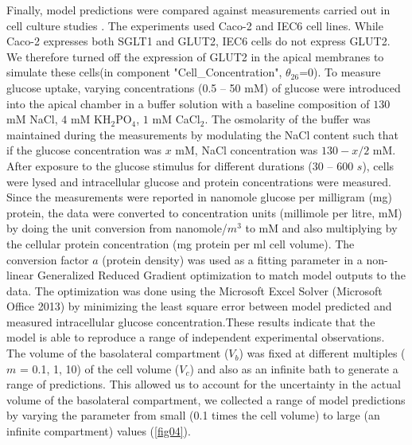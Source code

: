 \documentclass[fleqn,10pt]{physiome}
\begin{document}
Finally, model predictions were compared against measurements carried out in
cell culture studies \citep{zheng2012mechanisms}. The experiments used Caco-2 and
IEC6 cell lines. While Caco-2 expresses both SGLT1 and GLUT2, IEC6 cells
do not express GLUT2. We therefore turned off the expression of GLUT2 in
the apical membranes to simulate these cells(in component "Cell\_Concentration", {$\theta_{26}$}=0). To measure glucose uptake, varying concentrations (0.5 -- 50 mM) of glucose were introduced into the apical chamber in a buffer solution with a baseline composition of $130$ mM NaCl, $4$ mM KH$_2$PO$_4$, $1$ mM CaCl$_2$. The osmolarity of the buffer was maintained during the measurements by modulating the NaCl content such that if the glucose concentration was $x$ mM, NaCl concentration was $130 - x/2$ mM. After exposure to the glucose stimulus for different durations (30 -- 600 $s$), cells were lysed and intracellular glucose and protein concentrations were measured. Since the measurements were reported in nanomole glucose per milligram (mg) protein, the data were converted to concentration units (millimole per litre, mM) by doing the unit conversion from nanomole/$m^{3}$ to mM and also multiplying by the cellular protein concentration (mg protein per ml cell volume). The conversion factor $a$ (protein density) was used as a fitting parameter in a non-linear Generalized Reduced Gradient optimization to match model outputs to the data. The optimization  was done using the Microsoft Excel Solver (Microsoft Office 2013) by minimizing the least square error between model predicted and measured intracellular glucose concentration.These results indicate that the model is able to reproduce a range of independent experimental observations.
The volume of the basolateral compartment ($V_b$) was fixed at different multiples ($m$ = 0.1, 1, 10) of the cell volume ($V_c$) and also as an infinite bath to generate a range of predictions. This allowed us to account for the uncertainty in the actual volume of the basolateral compartment, we collected a range of model predictions by varying the parameter from small (0.1 times the cell volume) to large (an infinite compartment) values (\autoref{fig04}).\newline
\end{document}
